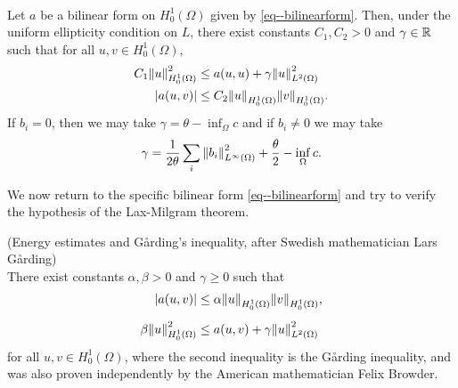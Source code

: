 \documentclass[11pt]{article}
\begin{document}
			\begin{thm}\phantom{k}\\
				Let $a$ be a bilinear form on $H^1_0(\Omega)$ given by \eqref{eq--bilinearform}. Then, under the uniform ellipticity condition on $L$, there exist constants $C_1,C_2>0$ and $\gamma\in\mathbb{R}$ such that for all $u,v\in H^1_0(\Omega)$,
				\begin{align*}
					C_1\norm{u}^2_{H^1_0(\Omega)}&\le a(u,u)+\gamma\norm{u}^2_{L^2(\Omega)}\\
					|a(u,v)|&\le C_2\norm{u}_{H^1_0(\Omega)}\norm{v}_{H^1_0(\Omega)}.
				\end{align*}
				If $b_i=0$, then we may take $\gamma=\theta-\inf_\Omega c$ and if $b_i\neq0$ we may take 
				\begin{equation*}
					\gamma=\frac{1}{2\theta}\sum_i\norm{b_i}^2_{L^\infty(\Omega)}+\frac{\theta}{2}-\inf_\Omega c.
				\end{equation*}
			\end{thm}

			We now return to the specific bilinear form \eqref{eq--bilinearform} and try to verify the hypothesis of the Lax-Milgram theorem.

			\begin{thm}\label{thm--energy.estimate}
				(Energy estimates and G\aa rding's inequality, after Swedish mathematician Lars G\aa rding)\\ There exist constants $\alpha,\beta>0$ and $\gamma\ge0$ such that
				\begin{align*}
					|a(u,v)|&\le\alpha\norm{u}_{H^1_0(\Omega)}\norm{v}_{H^1_0(\Omega)},\\[.5em]
					\beta\norm{u}^2_{H^1_0(\Omega)}&\le a(u,v)+\gamma\norm{u}^2_{L^2(\Omega)}
				\end{align*}
				for all $u,v\in H^1_0(\Omega)$, where the second inequality is the G\aa rding inequality, and was also proven independently by the American mathematician Felix Browder.
			\end{thm}
			
\end{document}
